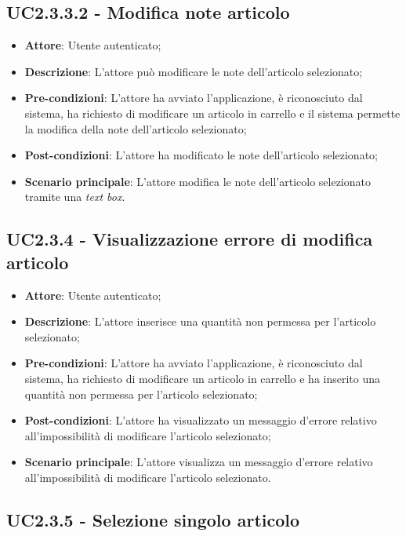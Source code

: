 \subsection{UC2.3.3.2 - Modifica note articolo}

\begin{itemize}
	\item \textbf{Attore}: Utente autenticato;
	\item \textbf{Descrizione}: L'attore può modificare le note dell'articolo selezionato;
	\item \textbf{Pre-condizioni}: L'attore ha avviato l'applicazione, è riconosciuto dal sistema, ha richiesto di modificare un articolo in carrello e il sistema permette la modifica della note dell'articolo selezionato;
	\item \textbf{Post-condizioni}: L'attore ha modificato le note dell'articolo selezionato;
	\item \textbf{Scenario principale}: L'attore modifica le note dell'articolo selezionato tramite una \textit{text box}.
\end{itemize}

\subsection{UC2.3.4 - Visualizzazione errore di modifica articolo}

\begin{itemize}
	\item \textbf{Attore}: Utente autenticato;
	\item \textbf{Descrizione}: L'attore inserisce una quantità non permessa per l'articolo selezionato;
	\item \textbf{Pre-condizioni}: L'attore ha avviato l'applicazione, è riconosciuto dal sistema, ha richiesto di modificare un articolo in carrello e ha inserito una quantità non permessa per l'articolo selezionato;
	\item \textbf{Post-condizioni}: L'attore ha visualizzato un messaggio d'errore relativo all'impossibilità di modificare l'articolo selezionato;
	\item \textbf{Scenario principale}: L'attore visualizza un messaggio d'errore relativo all'impossibilità di modificare l'articolo selezionato.
\end{itemize}

\subsection{UC2.3.5 - Selezione singolo articolo}

